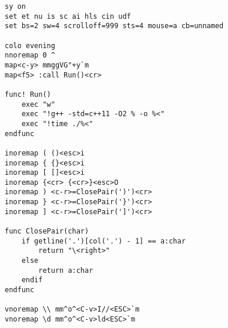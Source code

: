 \begin{lstlisting}
sy on
set et nu is sc ai hls cin udf
set bs=2 sw=4 scrolloff=999 sts=4 mouse=a cb=unnamed

colo evening
nnoremap 0 ^
map<c-y> mmggVG"+y`m
map<f5> :call Run()<cr>

func! Run()
    exec "w"
    exec "!g++ -std=c++11 -O2 % -o %<"
    exec "!time ./%<"
endfunc

inoremap ( ()<esc>i
inoremap { {}<esc>i
inoremap [ []<esc>i
inoremap {<cr> {<cr>}<esc>O
inoremap ) <c-r>=ClosePair(')')<cr>
inoremap } <c-r>=ClosePair('}')<cr>
inoremap ] <c-r>=ClosePair(']')<cr>

func ClosePair(char)
    if getline('.')[col('.') - 1] == a:char
        return "\<right>"
    else
        return a:char
    endif
endfunc

vnoremap \\ mm^o^<C-v>I//<ESC>`m
vnoremap \d mm^o^<C-v>ld<ESC>`m
\end{lstlisting}
